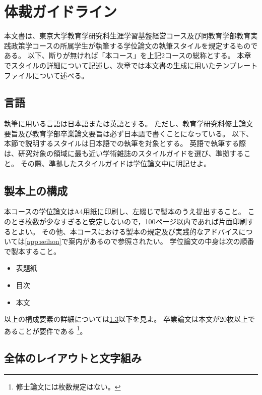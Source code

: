 
\chapter{体裁ガイドライン}
	\label{chp:guideline}

	本文書は、東京大学教育学研究科生涯学習基盤経営コース及び同教育学部教育実践政策学コースの所属学生が執筆する学位論文の執筆スタイルを規定するものである。
	以下、断りが無ければ「本コース」を上記2コースの総称とする。
	本章でスタイルの詳細について記述し、次章では本文書の生成に用いたテンプレートファイルについて述べる。

	\section{言語}
		\label{sub:language}

		執筆に用いる言語は日本語または英語とする。
		ただし、教育学研究科修士論文要旨及び教育学部卒業論文要旨は必ず日本語で書くことになっている。
		以下、本節で説明するスタイルは日本語での執筆を対象とする。
		英語で執筆する際は、研究対象の領域に最も近い学術雑誌のスタイルガイドを選び、準拠すること。
		その際、準拠したスタイルガイドは学位論文中に明記せよ。

	\section{製本上の構成}
		\label{sub:seihon}

		本コースの学位論文はA4用紙に印刷し、左綴じで製本のうえ提出すること。
		このとき枚数が少なすぎると安定しないので，100ページ以内であれば片面印刷するとよい。
		その他、本コースにおける製本の規定及び実践的なアドバイスについては\cref{app:seihon}で案内があるので参照されたい。
		学位論文の中身は次の順番で製本すること。

	\begin{itemize}
		\item 表題紙
		\item 目次
		\item 本文
	\end{itemize}

	以上の構成要素の詳細については\cref{sec:layout}以下を見よ。
	卒業論文は本文が20枚以上であることが要件である
	\footnote{修士論文には枚数規定はない。}。

	\section{全体のレイアウトと文字組み}
		\label{sec:layout}

